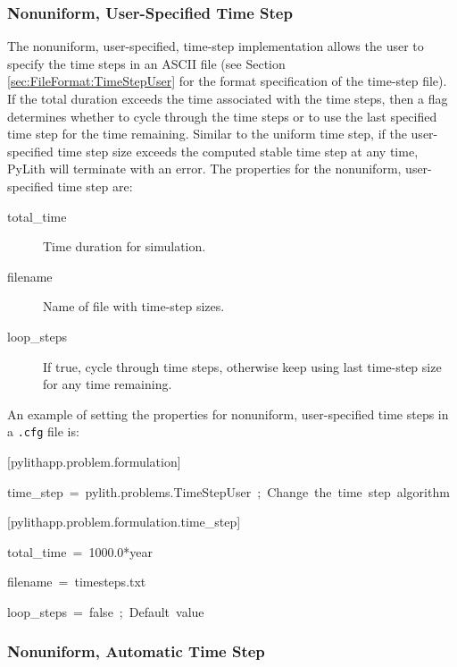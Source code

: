 \subsubsection{Nonuniform, User-Specified Time Step}

The nonuniform, user-specified, time-step implementation allows the
user to specify the time steps in an ASCII file (see Section \ref{sec:FileFormat:TimeStepUser}
for the format specification of the time-step file). If the total
duration exceeds the time associated with the time steps, then a flag
determines whether to cycle through the time steps or to use the last
specified time step for the time remaining. Similar to the uniform
time step, if the user-specified time step size exceeds the computed
stable time step at any time, PyLith will terminate with an error.
The properties for the nonuniform, user-specified time step are:
\begin{description}
\item [{total\_time}] Time duration for simulation.
\item [{filename}] Name of file with time-step sizes.
\item [{loop\_steps}] If true, cycle through time steps, otherwise keep
using last time-step size for any time remaining.
\end{description}
An example of setting the properties for nonuniform, user-specified
time steps in a \texttt{.cfg} file is:
\begin{lyxcode}
{[}pylithapp.problem.formulation{]}

time\_step~=~pylith.problems.TimeStepUser~;~Change~the~time~step~algorithm



{[}pylithapp.problem.formulation.time\_step{]}

total\_time~=~1000.0{*}year

filename~=~timesteps.txt

loop\_steps~=~false~;~Default~value
\end{lyxcode}

\subsubsection{Nonuniform, Automatic Time Step}

